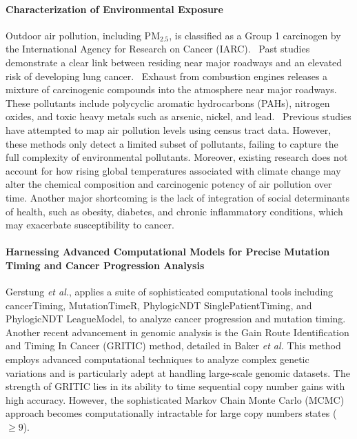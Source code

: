 \paragraph{Characterization of Environmental Exposure}
Outdoor air pollution, including PM$_{2.5}$, is classified as a Group 1 carcinogen by the International Agency for Research on Cancer (IARC).~\cite{gowda_ambient_2019} 
Past studies demonstrate a clear link between residing near major roadways and an elevated risk of developing lung cancer.~\cite{gowda_ambient_2019} 
Exhaust from combustion engines releases a mixture of carcinogenic compounds into the atmosphere near major roadways. 
These pollutants include polycyclic aromatic hydrocarbons (PAHs), nitrogen oxides, and toxic heavy metals such as arsenic, nickel, and lead.~\cite{yu_characterization_2015} 
Previous studies have attempted to map air pollution levels using census tract data.
However, these methods only detect a limited subset of pollutants, failing to capture the full complexity of environmental pollutants.
Moreover, existing research does not account for how rising global temperatures associated with climate change 
may alter the chemical composition and carcinogenic potency of air pollution over time. 
Another major shortcoming is the lack of integration of social determinants of health, 
such as obesity, diabetes, and chronic inflammatory conditions, which may exacerbate susceptibility to cancer.

\paragraph{Harnessing Advanced Computational Models for Precise Mutation Timing and Cancer Progression Analysis}

Gerstung \textit{et al.}, applies a suite of sophisticated computational tools including 
cancerTiming, MutationTimeR, PhylogicNDT SinglePatientTiming, and PhylogicNDT LeagueModel, 
to analyze cancer progression and mutation timing. 
Another recent advancement in genomic analysis is the Gain Route Identification and Timing In Cancer (GRITIC) method, 
detailed in Baker \textit{et al.}
This method employs advanced computational techniques to analyze complex genetic variations 
and is particularly adept at handling large-scale genomic datasets. 
The strength of GRITIC lies in its ability to time sequential copy number gains with high accuracy.
However, the sophisticated Markov Chain Monte Carlo (MCMC) approach becomes computationally intractable 
for large copy numbers states ($\geq 9$).~\cite{baker_history_2023}

